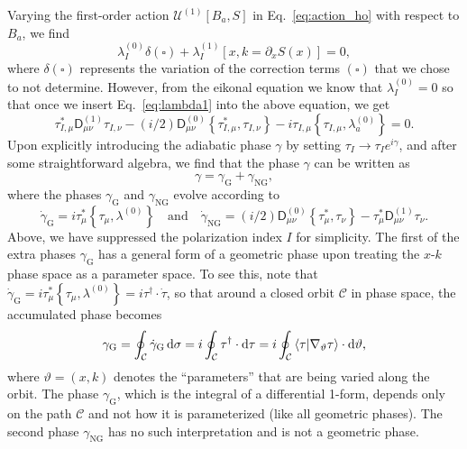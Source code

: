 Varying the first-order action $\mathscr{U}^{(1)}[B_{a}, S]$ in Eq.~\eqref{eq:action_ho} with respect to $B_{a}$, we find
%
\begin{equation}
  \lambda_{I}^{(0)}\delta(\square) + \lambda_{I}^{(1)}\left[x, k=\partial_{x}S(x)\right] = 0,
\end{equation}
%
where $\delta(\square)$ represents the variation of the correction terms $(\square)$ that we chose to not determine.
However, from the eikonal equation we know that $\lambda_{I}^{(0)} = 0$ so that once we insert Eq.~\eqref{eq:lambda1} into the above equation, we get
%
\begin{equation}
\tau_{I,\mu}^{*}\mathsf{D}_{\mu\nu}^{(1)}\tau_{I,\nu} - (i/2)\mathsf{D}^{(0)}_{\mu\nu}\left\{\tau_{I,\mu}^{*}, \tau_{I,\nu}\right\}
  - i\tau_{I,\mu}\left\{\tau_{I,\mu}, \lambda^{(0)}_{a}\right\} = 0.
\end{equation}
%
Upon explicitly introducing the adiabatic phase $\gamma$ by setting $\tau_{I} \to \tau_{I} e^{i\gamma}$, and after some straightforward algebra, we find that the phase $\gamma$ can be written as
%
\begin{equation}
  {\gamma} = {\gamma}_{\text{G}} + {\gamma}_{\text{NG}},
\end{equation}
%
where the phases ${\gamma}_{\text{G}}$ and ${\gamma}_{\text{NG}}$ evolve according to
%
\begin{equation}
  \dot{\gamma}_{\text{G}} = i\tau_{\mu}^{*}\left\{\tau_{\mu}, \lambda^{(0)}\right\}
  \quad\text{and}\quad
\dot{\gamma}_{\text{NG}} = (i/2)\mathsf{D}^{(0)}_{\mu\nu}\left\{\tau_{\mu}^{*}, \tau_{\nu}\right\} - \tau_{\mu}^{*}\mathsf{D}_{\mu\nu}^{(1)}\tau_{\nu}.
\label{eq:extra_phases}
\end{equation}
%
Above, we have suppressed the polarization index $I$ for simplicity.
The first of the extra phases $\gamma_{\text{G}}$ has a general form of a geometric phase upon treating the $x$-$k$ phase space as a parameter space.
To see this, note that $\dot{\gamma}_{\text{G}} = i\tau^{*}_{\mu}\left\{\tau_{\mu},\lambda^{(0)}\right\} = i\tau^{\dagger}\cdot\dot{\tau}$, so that around a closed orbit $\mathcal{C}$ in phase space, the accumulated phase becomes
%
\begin{equation}
\gamma_{\text{G}}
= \oint_{\mathcal{C}} \dot{\gamma}_{\text{G}}\,\mathrm{d}{\sigma}
= i\oint_{\mathcal{C}} \tau^{\dagger}\cdot\mathrm{d}{\tau}
= i\oint_{\mathcal{C}} \mathinner{\langle{\tau |\nabla_{\vartheta}\tau}\rangle}
\cdot\mathrm{d}\vartheta,
\end{equation}
%
where $\vartheta = (x, k)$ denotes the ``parameters'' that are being varied along the orbit.
The phase $\gamma_{\text{G}}$, which is the integral of a differential 1-form, depends only on the path $\mathcal{C}$ and not how it is parameterized (like all geometric phases).
The second phase $\gamma_{\text{NG}}$ has no such interpretation and is not a geometric phase.

